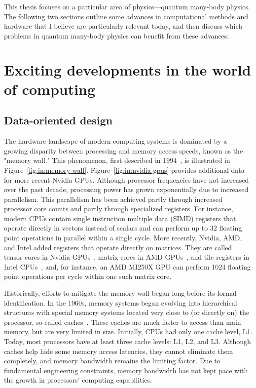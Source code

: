 This thesis focuses on a particular area of physics---quantum many-body physics. The following two sections outline some advances in computational methods and hardware that I believe are particularly relevant today, and then discuss which problems in quantum many-body physics can benefit from these advances.

\section{Exciting developments in the world of computing}

\subsection{Data-oriented design}\label{sec:intro:data-oriented}

The hardware landscape of modern computing systems is dominated by a growing disparity between processing and memory access speeds, known as the "memory wall." This phenomenon, first described in 1994~\cite{Wulf_1995_Hitting_the_mem}, is illustrated in Figure~\ref{fig:in:memory-wall}. Figure~\ref{fig:in:nvidia-gpus} provides additional data for more recent Nvidia GPUs. Although processor frequencies have not increased over the past decade, processing power has grown exponentially due to increased parallelism. This parallelism has been achieved partly through increased processor core counts and partly through specialized registers. For instance, modern CPUs contain single instruction multiple data (SIMD) registers that operate directly in vectors instead of scalars and can perform up to 32 floating point operations in parallel within a single cycle. More recently, Nvidia, AMD, and Intel added registers that operate directly on matrices. They are called tensor cores in Nvidia GPUs~\cite{NvidiaTensorCores}, matrix cores in AMD GPUs~, and tile registers in Intel CPUs~\cite{Intel_AMX}, and, for instance, an AMD MI250X GPU can perform 1024 floating point operations per cycle within one such matrix core.

Historically, efforts to mitigate the memory wall began long before its formal identification. In the 1960s, memory systems began evolving into hierarchical structures with special memory systems located very close to (or directly on) the processor, so-called caches~\cite{Liptay_1968_Structural_aspe}. These caches are much faster to access than main memory, but are very limited in size. Initially, CPUs had only one cache level, L1. Today, most processors have at least three cache levels: L1, L2, and L3. Although caches help hide some memory access latencies, they cannot eliminate them completely, and memory bandwidth remains the limiting factor. Due to fundamental engineering constraints, memory bandwidth has not kept pace with the growth in processors' computing capabilities. 

